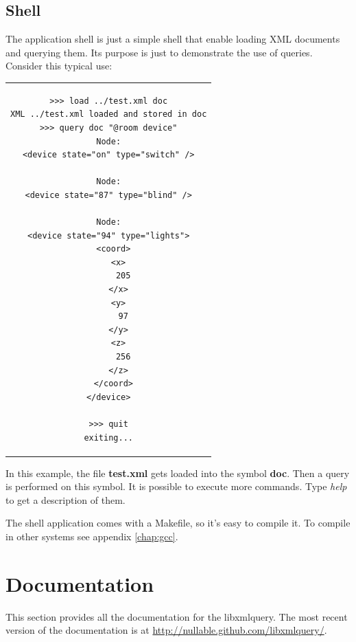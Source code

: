 \documentclass[a4paper]{report}
\begin{document}
	\section{Shell}
		The application shell is just a simple shell that enable loading XML documents and querying them. Its purpose is just to demonstrate the use of queries. Consider this typical use:

\begin{center}
\lstset{language=bash,caption=Typical usage of the shell application. The banner was intentionally removed., captionpos=b}
\begin{tabular}{c}
\begin{lstlisting}		
>>> load ../test.xml doc
XML ../test.xml loaded and stored in doc
>>> query doc "@room device"
Node:
<device state="on" type="switch" />

Node:
<device state="87" type="blind" />

Node:
<device state="94" type="lights">
  <coord>
    <x>
      205
    </x>
    <y>
      97
    </y>
    <z>
      256
    </z>
  </coord>
</device>

>>> quit
exiting...
\end{lstlisting}
\end{tabular}
\end{center}
		
		In this example, the file \textbf{test.xml} gets loaded into the symbol \textbf{doc}. Then a query is performed on this symbol. It is possible to execute more commands. Type \emph{help} to get a description of them.
		
		The shell application comes with a Makefile, so it's easy to compile it. To compile in other systems see appendix \ref{chap:gcc}.
		
\chapter{Documentation}\label{chap:doc}
	This section provides all the documentation for the libxmlquery. The most recent version of the documentation is at \url{http://nullable.github.com/libxmlquery/}.
	
\end{document}
